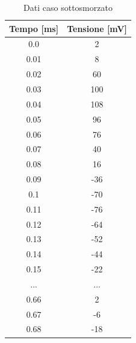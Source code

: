 \documentclass[letterpaper,12pt]{article}
\begin{document}
\begin{table}[htbp]
    \centering
    \caption{Dati caso sottosmorzato}
    \begin{tabular}{cc}
        \toprule
        Tempo [ms] & Tensione [mV] \\
        \midrule
        0.0 & 2 \\
        0.01 & 8 \\
        0.02 & 60 \\
        0.03 & 100 \\
        0.04 & 108 \\
        0.05 & 96 \\
        0.06 & 76 \\
        0.07 & 40 \\
        0.08 & 16 \\
        0.09 & -36 \\
        0.1 & -70 \\
        0.11 & -76 \\
        0.12 & -64 \\
        0.13 & -52 \\
        0.14 & -44 \\
        0.15 & -22 \\
        ... & ...\\
        0.66 & 2 \\
        0.67 & -6 \\
        0.68 & -18 \\
        \bottomrule
    \end{tabular}
    \label{tab:dati_RLC_ssm}
\end{table}
\end{document}

